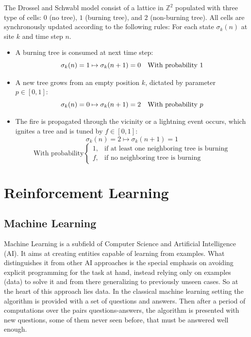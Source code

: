 \documentclass[
  openany]{book}
\begin{document}
The Drossel and Schwabl model consist of a lattice in \(\mathds{Z}^2\) populated with three type of cells: \(0\) (no tree), \(1\) (burning tree), and \(2\) (non-burning tree). All cells are synchronously updated according to the following rules:
For each state \(\sigma_k(n)\) at site \(k\) and time step \(n\).

\begin{itemize}
\item
  A burning tree is consumed at next time step:
  \[\sigma_k(n) = 1 \mapsto  \sigma_k(n+1) = 0 \textrm{\quad With probability}\ 1\]
\item
  A new tree grows from an empty position \(k\), dictated by parameter \(p \in [0,1]:\)
  \[\sigma_k(n) = 0 \mapsto  \sigma_k(n+1) = 2 \textrm{\quad With probability}\ p\]
\item
  The fire is propagated through the vicinity or a lightning event occurs, which ignites a tree and is tuned by \(f \in [0,1]:\)
  \[\sigma_k(n) = 2 \mapsto  \sigma_k(n+1) = 1\]
  \[\textrm{With probability} \begin{cases}
  1, & \textrm{if at least one neighboring tree is burning}\\
  f, & \textrm{if no neighboring tree is burning}
  \end{cases}\]
\end{itemize}

\hypertarget{reinforcement-learning}{%
\chapter{Reinforcement Learning}\label{reinforcement-learning}}

\hypertarget{machine-learning}{%
\section{Machine Learning}\label{machine-learning}}

Machine Learning is a subfield of Computer Science and Artificial Intelligence (AI). It aims at creating entities capable of learning from examples. What distinguishes it from other AI approaches is the special emphasis on avoiding explicit programming for the task at hand, instead relying only on examples (data) to solve it and from there generalizing to previously unseen cases. So at the heart of this approach lies data. In the classical machine learning setting the algorithm is provided with a set of questions and answers. Then after a period of computations over the pairs questions-answers, the algorithm is presented with new questions, some of them never seen before, that must be answered well enough.
\end{document}
